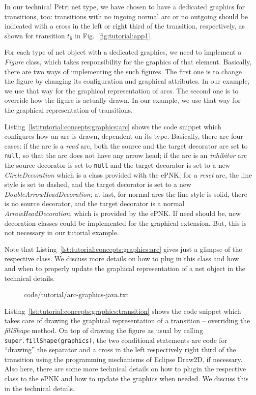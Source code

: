 In our technical Petri net type, we have chosen to have a dedicated graphics
for transitions, too: transitions with no ingoing normal arc or no outgoing
should be indicated with a cross in the left or right third of the transition,
respectively, as shown for transition $t_6$ in Fig.~\ref{fig:tutorial:app1}. 

For each type of net object with a dedicated graphics, we need to implement a
\emph{Figure} class, which takes responsibility for the graphics of that
element.
Basically, there are two ways of implementing the such figures. The
first one is to change the figure by changing its configuration and graphical
attributes. In our example, we use that way for the graphical representation of
arcs. The second one is to override how the figure is actually drawn.
In our example, we use that way for the graphical representation of transitions.


Listing~\ref{lst:tutorial:concepts:graphics:arc} shows the code snippet which
configures how an arc is drawn, dependent on its type. Basically, there are
four cases: if the arc is a \emph{read} arc, both the source and the target
decorator are set to {\tt null}, so that the arc does not have any arrow
head; if the arc is an \emph{inhibitor} arc the source decorator is set to
{\tt null} and the target decorator is set to a new \emph{CircleDecoration}
which is a class provided with the ePNK; for a \emph{reset} arc, the line style is
set to dashed, and the target decorator is set to a new
\emph{DoubleArrowHeadDecoration}; at last, for normal arcs the line style is
solid, there is no source decorator, and the target decorator is a normal
\emph{ArrowHeadDecoration}, which is provided by the ePNK. If need should be,
new decoration classes could be implemented for the graphical extension. But,
this is not necessary in our tutorial example.

Note that Listing~\ref{lst:tutorial:concepts:graphics:arc} gives just a glimpse
of the respective class. We discuss more details on how to plug in this class
and how and when to properly update the graphical representation of a net object
in the technical details.

\begin{figure}[htbp!]
%
  {code/tutorial/arc-graphics-java.txt}
\end{figure}


Listing~\ref{lst:tutorial:concepts:graphics:transition} shows the code snippet
which takes care of drawing the graphical representation of a transition --
overriding the \emph{fillShape} method. On top of drawing the figure as usual
by calling {\tt super.fillShape(graphics)}, the two conditional statements
are code for ``drawing'' the separator and a cross in the left respectively right
third of the transition using the programming mechanisms of Eclipse Draw2D, if
necessary. Also here, there are some more technical details on how to plugin the
respective class to the ePNK and how to update the graphics when needed. We
discuss this in the technical details.

